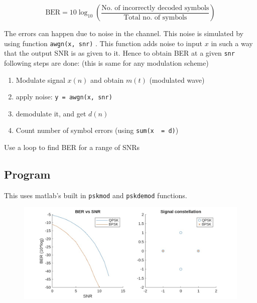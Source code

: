 $$\text{BER} = 10\log_{10} \left(\frac{\text {No. of incorrectly decoded symbols}}{\text{Total no. of symbols}}\right)$$

The errors can happen due to noise in the channel.
This noise is simulated by using function \texttt{awgn(x, snr)} .
This function adds noise to input $x$ in such a way that the output SNR is as given to it.
Hence to obtain BER at a given \texttt{snr} following steps are done: (this is same for any modulation scheme)
\begin{enumerate}
	\item Modulate signal $x(n)$ and obtain $m(t)$ (modulated wave)
	\item apply noise: \texttt{y = awgn(x, snr)} 
	\item demodulate it, and get $d(n)$
	\item Count number of symbol errors (using \texttt{sum(x ~= d)})
\end{enumerate}

{\setlength{\parindent}{0pt} Use a loop to find BER for a range of SNRs}

\subsection*{Program}
This uses matlab's built in \texttt{pskmod} and \texttt{pskdemod} functions.



\begin{figure}[!ht]
	\centering
	\includegraphics[width=\linewidth]{img/psk_props.pdf}
\end{figure}

